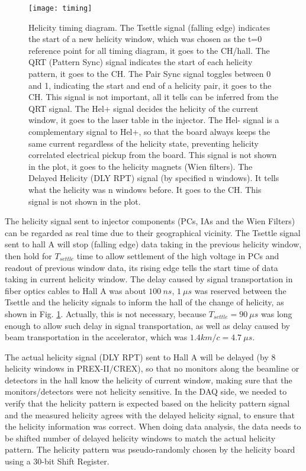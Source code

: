 \begin{figure}
    \centering
    \texttt{[image: timing]}
    \caption{Helicity timing diagram. The Tsettle signal (falling edge) indicates 
    the start of a new helicity window, which was chosen as the t=0 reference
    point for all timing diagram, it goes to the CH/hall.
    The QRT (Pattern Sync) signal indicates the start of each helicity pattern,
    it goes to the CH. 
    The Pair Sync signal toggles between 0 and 1, indicating the start and end
    of a helicity pair, it goes to the CH. This signal is not important, all it
    tells can be inferred from the QRT signal.
    The Hel+ signal decides the helicity of the current window, it goes to the 
    laser table in the injector.
    The Hel- signal is a complementary signal to Hel+, so that the board always 
    keeps the same current regardless of the helicity state, preventing helicity 
    correlated electrical pickup from the board. This signal is not shown in the
    plot, it goes to the helicity magnets (Wien filters).
    The Delayed Helicity (DLY RPT) signal (by specified n windows).
    It tells what the helicity was n windows before. It goes to the CH. This
    signal is not shown in the plot.}
    \label{fig:timing}
\end{figure}

The helicity signal sent to injector components (PCs, IAs and the Wien Filters) 
can be regarded as real time due to their geographical vicinity. The Tsettle 
signal sent to hall A 
will stop (falling edge) data taking in the previous helicity window, then hold for
$T_{settle}$ time to allow settlement of the high voltage in PCs %
and readout of previous window data, its rising edge tells the start time of data taking in current 
helicity window. The delay caused by signal transportation in fiber optics cables to Hall A 
was about $100\ ns$, $1\ \mu s$ was reserved between the Tsettle and the helicity
signals to inform the hall of the change of helicity, as shown in Fig. \ref{fig:timing}.
Actually, this is not necessary, because $T_{settle} = 90\ \mu s$ was long enough to
allow such delay in signal transportation, as well as delay caused by beam 
transportation in the accelerator, which was $1.4 km/c = 4.7\ \mu s$.

The actual helicity signal (DLY RPT) sent to Hall A will be delayed (by 8 helicity windows
in PREX-II/CREX), so that no monitors along the beamline or detectors in the 
hall know the helicity of current window, making sure that the monitors/detectors
were not helicity sensitive. In the DAQ side, we needed to verify that
the helicity pattern is expected based on the helicity pattern signal and the 
measured helicity agrees with the delayed helicity signal, to ensure that the
helicity information was correct. When doing data analysis, the data needs 
to be shifted number of delayed helicity windows to match the actual helicity 
pattern. The helicity pattern was pseudo-randomly chosen by the helicity board 
using a 30-bit Shift Register.

